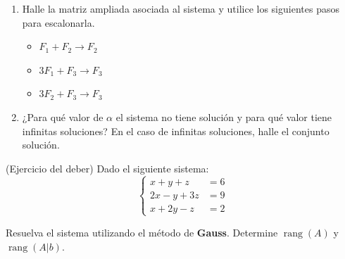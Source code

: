 \documentclass[10pt,a4]{examenEPN0}
\begin{document}
\begin{preguntas}
\begin{enumerate}
    \item Halle la matriz ampliada asociada al sistema y utilice los siguientes pasos para escalonarla.  
    \begin{itemize}
        \item \( F_1+F_2 \rightarrow F_2 \)
        \item \( 3F_1+F_3 \rightarrow F_3 \)
        \item \( 3F_2+F_3 \rightarrow F_3 \)
    \end{itemize}

    \item ¿Para qué valor de \(\alpha\) el sistema no tiene solución y para qué valor tiene infinitas soluciones? En el caso de infinitas soluciones, halle el conjunto solución. 
    
\end{enumerate}
\par\vfill\newpage


\item (Ejercicio del deber) Dado el siguiente sistema:
\[
\left\{
\begin{aligned}
x + y + z &= 6 \\
2x - y + 3z &= 9 \\
x + 2y - z &= 2
\end{aligned}
\right.
\]

 Resuelva el sistema utilizando el método de \textbf{Gauss}. Determine $\operatorname{rang}(A)$ y $\operatorname{rang}(A|b)$. 




    
\par\vfill
\end{preguntas}
\final
\end{document}
